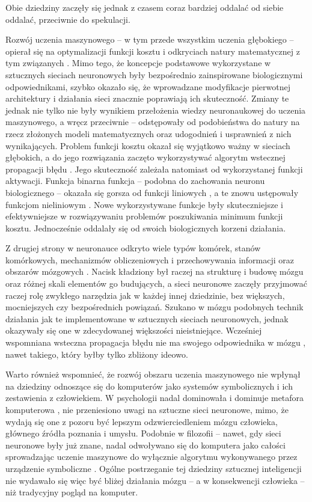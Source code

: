 Obie dziedziny zaczęły się jednak z czasem coraz bardziej oddalać od siebie oddalać, przeciwnie do spekulacji.

Rozwój uczenia maszynowego -- w tym przede wszystkim uczenia głębokiego -- opierał się na optymalizacji funkcji kosztu i odkryciach natury matematycznej z tym związanych \cite{sutskever2013importance}.
Mimo tego, że koncepcje podstawowe wykorzystane w sztucznych sieciach neuronowych były bezpośrednio zainspirowane biologicznymi odpowiednikami, szybko okazało się, że wprowadzane modyfikacje pierwotnej architektury i działania sieci znacznie poprawiają ich skuteczność.
Zmiany te jednak nie tylko nie były wynikiem przełożenia wiedzy neuronaukowej do uczenia maszynowego, a wręcz przeciwnie -- odstępowały od podobieństwa do natury na rzecz złożonych modeli matematycznych oraz udogodnień i usprawnień z nich wynikających.
Problem funkcji kosztu okazał się wyjątkowo ważny w sieciach głębokich, a do jego rozwiązania zaczęto wykorzystywać algorytm wstecznej propagacji błędu \cite{rumelhart1985learning}.
Jego skuteczność zależała natomiast od wykorzystanej funkcji aktywacji.
Funkcja binarna funkcja -- podobna do zachowania neuronu biologicznego -- okazała się gorsza od funkcji liniowych \cite{minsky2017perceptrons}, a te znowu ustępowały funkcjom nieliniowym \cite{haykin1994neural}.
Nowe wykorzystywane funkcje były skuteczniejsze i efektywniejsze \cite{sharma2017activation} w rozwiązywaniu problemów poszukiwania minimum funkcji kosztu.
Jednocześnie oddalały się od swoich biologicznych korzeni działania.

Z drugiej strony w neuronauce odkryto wiele typów komórek, stanów komórkowych, mechanizmów obliczeniowych i przechowywania informacji oraz obszarów mózgowych \cite{solari2011cognitive}.
Nacisk kładziony był raczej na strukturę i budowę mózgu oraz różnej skali elementów go budujących, a sieci neuronowe zaczęły przyjmować raczej rolę zwykłego narzędzia jak w każdej innej dziedzinie, bez większych, mocniejszych czy bezpośrednich powiązań.
Szukano w mózgu podobnych technik działania jak te implementowane w sztucznych sieciach neuronowych, jednak okazywały się one w zdecydowanej większości nieistniejące.
Wcześniej wspomniana wsteczna propagacja błędu nie ma swojego odpowiednika w mózgu \cite{hassabis2017neuroscience}, nawet takiego, który byłby tylko zbliżony ideowo.

Warto również wspomnieć, że rozwój obszaru uczenia maszynowego nie wpłynął na dziedziny odnoszące się do komputerów jako systemów symbolicznych i ich zestawienia z człowiekiem.
W psychologii nadal dominowała i dominuje metafora komputerowa \cite{casey1989computational}, nie przeniesiono uwagi na sztuczne sieci neuronowe, mimo, że wydają się one z pozoru być lepszym odzwierciedleniem mózgu człowieka, głównego źródła poznania i umysłu.
Podobnie w filozofii -- nawet, gdy sieci neuronowe były już znane, nadal odwoływano się do komputera jako całości sprowadzając uczenie maszynowe do wyłącznie algorytmu wykonywanego przez urządzenie symboliczne \cite{searle1980minds}.
Ogólne postrzeganie tej dziedziny sztucznej inteligencji nie wydawało się więc być bliżej działania mózgu -- a w konsekwencji człowieka -- niż tradycyjny pogląd na komputer.

